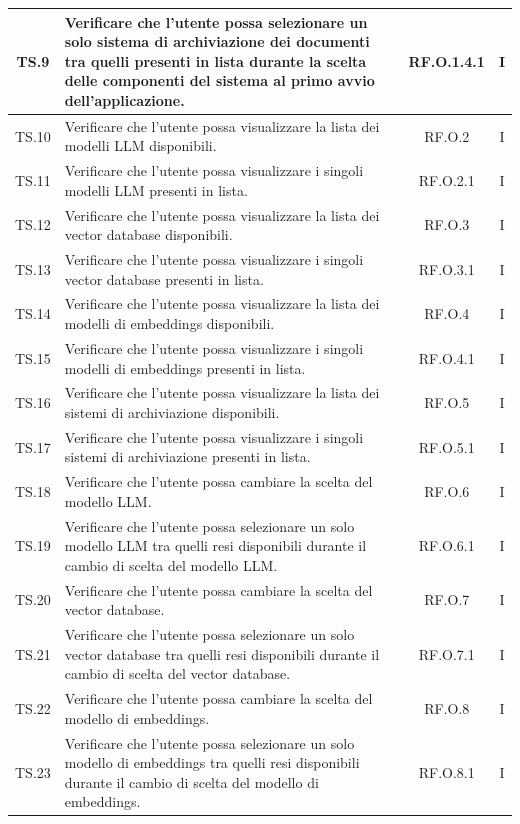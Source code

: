 \documentclass[10pt, a4paper]{article}
\begin{document}
\begin{xltabular}{\textwidth}{|c|X|c|c|}
\hline
TS.9 & Verificare che l'utente possa selezionare un solo sistema di archiviazione dei documenti tra quelli presenti in lista durante la scelta delle componenti del sistema al primo avvio dell'applicazione. & RF.O.1.4.1 & I \\
\hline
TS.10 & Verificare che l'utente possa visualizzare la lista dei modelli LLM disponibili. & RF.O.2 & I \\
\hline
TS.11 & Verificare che l'utente possa visualizzare i singoli modelli LLM presenti in lista. & RF.O.2.1 & I \\
\hline
TS.12 & Verificare che l'utente possa visualizzare la lista dei vector database disponibili. & RF.O.3 & I \\
\hline
TS.13 & Verificare che l'utente possa visualizzare i singoli vector database presenti in lista. & RF.O.3.1 & I \\
\hline
TS.14 & Verificare che l'utente possa visualizzare la lista dei modelli di embeddings disponibili. & RF.O.4 & I \\
\hline
TS.15 & Verificare che l'utente possa visualizzare i singoli modelli di embeddings presenti in lista. & RF.O.4.1 & I \\
\hline
TS.16 & Verificare che l'utente possa visualizzare la lista dei sistemi di archiviazione disponibili. & RF.O.5 & I \\
\hline
TS.17 & Verificare che l'utente possa visualizzare i singoli sistemi di archiviazione presenti in lista. & RF.O.5.1 & I \\
\hline
TS.18 & Verificare che l'utente possa cambiare la scelta del modello LLM. & RF.O.6 & I \\
\hline
TS.19 & Verificare che l'utente possa selezionare un solo modello LLM tra quelli resi disponibili durante il cambio di scelta del modello LLM. & RF.O.6.1 & I \\
\hline
TS.20 & Verificare che l'utente possa cambiare la scelta del vector database. & RF.O.7 & I \\
\hline
TS.21 & Verificare che l'utente possa selezionare un solo vector database tra quelli resi disponibili durante il cambio di scelta del vector database. & RF.O.7.1 & I \\
\hline
TS.22 & Verificare che l'utente possa cambiare la scelta del modello di embeddings. & RF.O.8 & I \\
\hline
TS.23 & Verificare che l'utente possa selezionare un solo modello di embeddings tra quelli resi disponibili durante il cambio di scelta del modello di embeddings. & RF.O.8.1 & I \\

\end{xltabular}
\end{document}
